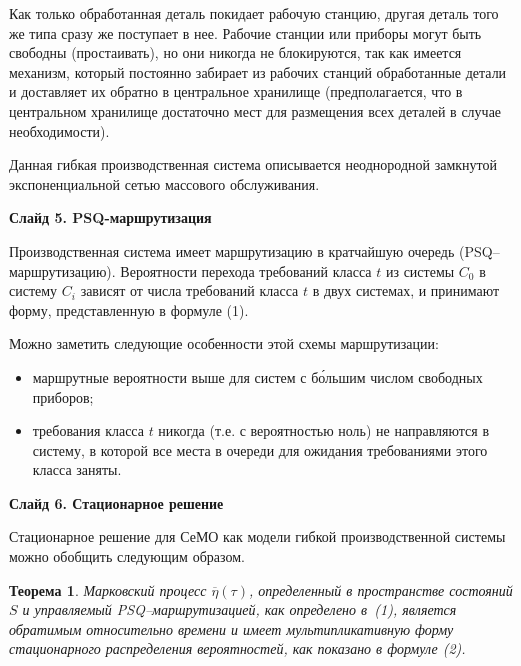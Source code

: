 \documentclass[a4paper,14pt]{extarticle}
\theoremstyle{note}
\newtheorem{theorem}{Теорема}
\begin{document}
Как только обработанная деталь покидает рабочую станцию, другая деталь того же типа сразу же поступает в нее. Рабочие станции или приборы могут быть свободны (простаивать), но они никогда не блокируются, так как имеется механизм, который постоянно забирает из рабочих станций обработанные детали и доставляет их обратно в центральное хранилище (предполагается, что в центральном хранилище достаточно мест для размещения всех деталей в случае необходимости).

Данная гибкая производственная система описывается неоднородной замкнутой экспоненциальной сетью массового обслуживания.


\textbf{Слайд 5. PSQ-маршрутизация}

Производственная система имеет маршрутизацию в кратчайшую очередь (PSQ--маршрутизацию). Вероятности перехода требований класса $t$ из системы $C_0$ в систему $C_i$ зависят от числа требований класса $t$ в двух системах, и принимают форму, представленную в формуле (1).

Можно заметить следующие особенности этой схемы маршрутизации:
\begin{itemize}
\item маршрутные вероятности выше для систем с б\'{о}льшим числом свободных приборов;
\item требования класса $t$ никогда (т.е. с вероятностью ноль) не направляются в систему, в которой все места в очереди для ожидания требованиями этого класса заняты.
\end{itemize}


\textbf{Слайд 6. Стационарное решение}

Стационарное решение для СеМО как модели гибкой производственной системы можно обобщить следующим образом.

\begin{theorem}
Марковский процесс $\overline{\eta}(\tau)$, определенный в пространстве состояний $S$ и управляемый PSQ--маршрутизацией, как определено в~(1), является обратимым относительно времени и имеет мультипликативную форму стационарного распределения вероятностей, как показано в формуле (2).
\end{theorem}

\end{document}
